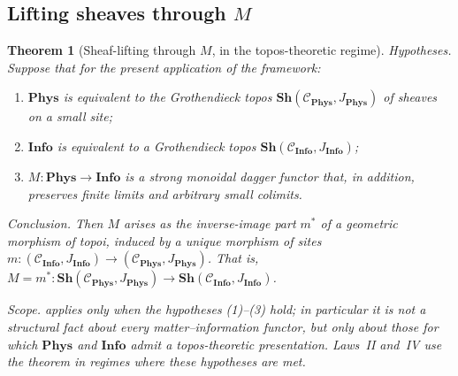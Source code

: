 \documentclass[12pt]{article}
\newtheorem{theorem}{Theorem}[section]
\theoremstyle{definition}
\theoremstyle{remark}
\newcommand{\C}{\mathcal{C}}
\newcommand{\Phys}{\mathbf{Phys}}
\newcommand{\Info}{\mathbf{Info}}
\begin{document}
\subsection{Lifting sheaves through \texorpdfstring{$M$}{M}}

\begin{theorem}[Sheaf-lifting through $M$, in the topos-theoretic regime]
\label{thm:sheaf-lifting}
\emph{Hypotheses.} Suppose that for the present application of the framework:
\begin{enumerate}
\item $\Phys$ is equivalent to the Grothendieck topos $\mathbf{Sh}(\C_\Phys, J_\Phys)$ of sheaves on a small site;
\item $\Info$ is equivalent to a Grothendieck topos $\mathbf{Sh}(\C_\Info, J_\Info)$;
\item $M : \Phys \to \Info$ is a strong monoidal dagger functor that, in addition, preserves finite limits and arbitrary small colimits.
\end{enumerate}
\emph{Conclusion.} Then $M$ arises as the inverse-image part $m^*$ of a geometric morphism of topoi, induced by a unique morphism of sites $m : (\C_\Info, J_\Info) \to (\C_\Phys, J_\Phys)$. That is, $M = m^* : \mathbf{Sh}(\C_\Phys, J_\Phys) \to \mathbf{Sh}(\C_\Info, J_\Info)$.

\emph{Scope.}  applies only when the hypotheses (1)--(3) hold; in particular it is not a structural fact about every matter--information functor, but only about those for which $\Phys$ and $\Info$ admit a topos-theoretic presentation. Laws~II and~IV use the theorem in regimes where these hypotheses are met.
\end{theorem}
\end{document}
